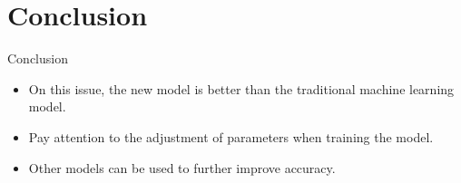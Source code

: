 \documentclass[
 size=14pt,
 paper=smartboard,  %
 mode=present, 		%
 display=slides, 	%
 style=tuliplab,  	%
 pauseslide,
 fleqn,leqno]{powerdot}
\begin{document}





\section{Conclusion}

\begin{slide}[toc=,bm=]{Conclusion}
\begin{itemize}
\item On this issue, the new model is better than the traditional machine learning model.
\smallskip

\item
\smallskip
Pay attention to the adjustment of parameters when training the model.

\item
\smallskip
Other models can be used to further improve accuracy.
\end{itemize}

\end{slide}


%
%
\end{document}
